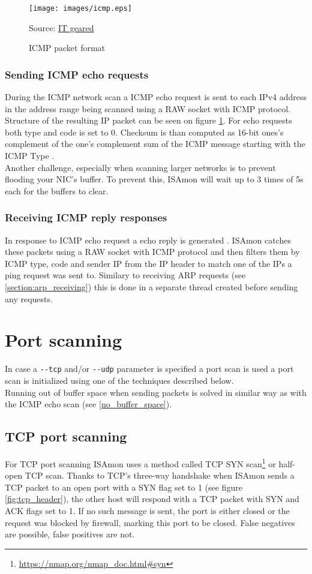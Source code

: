 \documentclass[11pt,a4paper]{article}
\newcommand{\source}[1]{\caption*{Source: {#1}} }
\begin{document}
		\begin{figure}[h]
			\centering
			\texttt{[image: images/icmp.eps]}
			\caption{ICMP packet format}
			\label{fig:icmp}
			\source{\href{http://www.itgeared.com/articles/1094-ping-and-icmp-error-messages/}{IT geared}}
		\end{figure}

		\subsubsection*{Sending ICMP echo requests}
			During the ICMP network scan a ICMP echo request is sent to each IPv4 address in the address range being scanned using a RAW socket with ICMP protocol. Structure of the resulting IP packet can be seen on figure \ref{fig:icmp}. For echo requests both type and code is set to 0. Checksum is than computed as 16-bit ones's complement of the one's complement sum of the ICMP message starting with the ICMP Type \cite{RFC0792}.\\
			\label{no_buffer_space} Another challenge, especially when scanning larger networks is to prevent flooding your NIC's buffer. To prevent this, ISAmon will wait up to 3 times of 5s each for the buffers to clear.

		\subsubsection*{Receiving ICMP reply responses}
			In response to ICMP echo request a echo reply is generated \cite{wiki:ping}. ISAmon catches these packets using a RAW socket with ICMP protocol and then filters them by ICMP type, code and sender IP from the IP header to match one of the IPs a ping request was sent to. Similary to receiving ARP requests (see \ref{section:arp_receiving}) this is done in a separate thread created before sending any requests.

\section{Port scanning}
	In case a \texttt{-{}-tcp} and/or \texttt{-{}-udp} parameter is specified a port scan is used a port scan is initialized using one of the techniques described below.\\
	Running out of buffer space when sending packets is solved in similar way as with the ICMP echo scan (see \ref{no_buffer_space}).

	\subsection{TCP port scanning}
		For TCP port scanning ISAmon uses a method called TCP SYN scan\footnote{\url{https://nmap.org/nmap_doc.html\#syn}} or half-open TCP scan. Thanks to TCP's three-way handshake when ISAmon sends a TCP packet to an open port with a SYN flag set to 1 (see figure \ref{fig:tcp_header}), the other host will respond with a TCP packet with SYN and ACK flags set to 1. If no such message is sent, the port is either closed or the request was blocked by firewall, marking this port to be closed. False negatives are possible, false positives are not.\\
\end{document}
